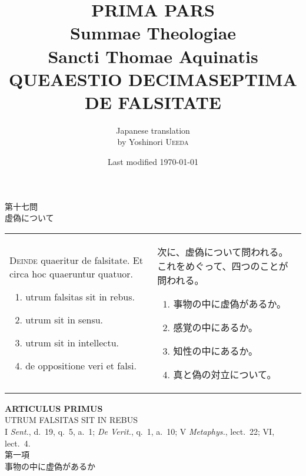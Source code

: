 \documentclass[paper=a4paper,fontsize=10pt,jafontsize=9pt,titlepage]{jlreq}
\title{{\bfseries PRIMA PARS}\\{\Huge Summae Theologiae}\\Sancti Thomae
Aquinatis\\{\sffamily QUEAESTIO DECIMASEPTIMA}\\DE FALSITATE}
\author{Japanese translation\\by Yoshinori {\scshape Ueeda}}
\date{Last modified \today}
\begin{document}
\maketitle
\pagestyle{fancy}

\begin{center}
{\Large 第十七問\\虚偽について}
\end{center}

\begin{longtable}{p{21em}p{21em}}

{\huge D}{\scshape einde} quaeritur de falsitate. Et circa hoc
 quaeruntur quatuor. 

\begin{enumerate}
 \item utrum falsitas sit in rebus.
 \item utrum sit in sensu.
 \item utrum sit in intellectu.
 \item de oppositione veri et falsi.
\end{enumerate}
 
&

次に、虚偽について問われる。これをめぐって、四つのことが問われる。
\begin{enumerate}
 \item 事物の中に虚偽があるか。
 \item 感覚の中にあるか。
 \item 知性の中にあるか。
 \item 真と偽の対立について。
\end{enumerate}


\end{longtable}

\newpage

\begin{center}
 {\Large {\bfseries ARTICULUS PRIMUS}}\\
 {\large UTRUM FALSITAS SIT IN REBUS}\\
 {\footnotesize I {\itshape Sent.}, d.~19, q.~5, a.~1; {\itshape De
 Verit.}, q.~1, a.~10; V {\itshape Metaphys.}, lect.~22; VI, lect.~4.}\\
 {\Large 第一項\\事物の中に虚偽があるか}
\end{center}
\end{document}
